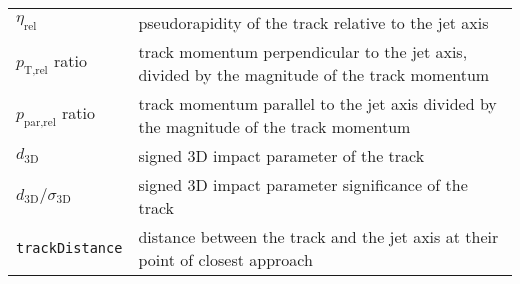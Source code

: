 \begin{table}[htb!]
\begin{center}
{\begin{tabular}{ll}
    $\eta_{\text{rel}}$ & pseudorapidity of the track relative to the jet axis \\
    $p_{\text{T,rel}}$ ratio & track momentum perpendicular to the jet axis,
    divided by the magnitude of the track momentum \\
    $p_{\text{par,rel}}$ ratio & track momentum parallel to the jet axis divided by
    the magnitude of the track momentum \\
    $d_{\text{3D}}$ &  signed 3D impact parameter of the track \\
    $d_{\text{3D}}/\sigma_{\text{3D}}$ & signed 3D impact parameter significance of
    the track \\
    \texttt{trackDistance} & distance between the track and the jet axis at their
    point of closest approach \\
    \hline\hline
    

\end{tabular}}
\end{center}
\end{table}
